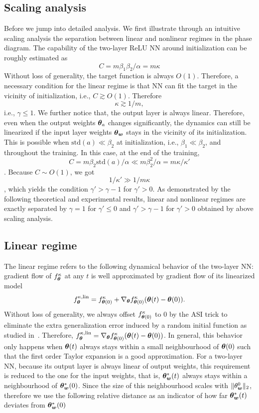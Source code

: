 \documentclass{article}
\begin{document}
\subsection{Scaling analysis}
Before we jump into detailed analysis. We first illustrate through an intuitive scaling analysis the separation between linear and nonlinear regimes in the phase diagram. 
The capability of the two-layer ReLU NN around initialization can be roughly estimated as 
\[
C = m \beta_1 \beta_2/\alpha=m\kappa
\]
Without loss of generality, the target function is always $O(1)$. Therefore, a necessary condition for the linear regime is that NN can fit the target in the vicinity of initialization, i.e., $C \gtrsim O(1)$. Therefore
\[
\kappa \gtrsim 1/m,
\]
i.e., $\gamma\leq1$. We further notice that, the output layer is always linear. Therefore, even when the output weights $\bm{\theta}_{a}$ changes significantly, the dynamics can still be linearized if the input layer weights $\bm{\theta}_{\bm{w}}$ stays in the vicinity of its initialization. This is possible when $\mathrm{std}(a)\ll \beta_2$ at initialization, i.e., $\beta_1\ll\beta_2$, and throughout the training. In this case, at the end of the training,  $$C = m\beta_2 \mathrm{std}(a)/\alpha  \ll m\beta_2^2/\alpha=m\kappa/\kappa'$$. Because $C \sim O(1)$, we got $$1/\kappa'\gg 1/m\kappa$$, which yields the condition $\gamma'>\gamma-1$ for $\gamma'>0$. As demonstrated by the following theoretical and experimental results, linear and nonlinear regimes are exactly separated by $\gamma=1$ for $\gamma'\leq0$ and $\gamma'>\gamma-1$ for $\gamma'>0$ obtained by above scaling analysis.

\subsection{Linear regime}
The linear regime refers to the following dynamical behavior of the two-layer NN: gradient flow of $f^{\kappa}_{\bm{\theta}}$ at any $t$ is well approximated by gradient flow of its linearized model 
\begin{equation}
    f^{\kappa,\mathrm{lin}}_{\bm{\theta}}=f^{\kappa}_{\bm{\theta}(0)}+\nabla_{\bm{\theta}}f^{\kappa}_{\bm{\theta}(0)}(\bm{\theta}(t)-\bm{\theta}(0)).    
\end{equation}
 Without loss of generality, we always offset $f^{\kappa}_{\bm{\theta}(0)}$ to $0$ by the ASI trick to eliminate the extra generalization error induced by a random initial function as studied in~\cite{zhang_type_2019}. Therefore, $f^{\kappa,\mathrm{lin}}_{\bm{\theta}}=\nabla_{\bm{\theta}}f^{\kappa}_{\bm{\theta}(0)}(\bm{\theta}(t)-\bm{\theta}(0))$. 
In general, this behavior only happens when $\bm{\theta}(t)$ always stays within a small neighbourhood of $\bm{\theta}(0)$ such that the first order Taylor expansion is a good approximation. For a two-layer NN, because its output layer is always linear of output weights, this requirement is reduced to the one for the input weights, that is, $\bm{\theta}^*_{\bm{w}}(t)$ always stays within a neighbourhood of $\bm{\theta}^*_{\bm{w}}(0)$. Since the size of this neighbourhood scales with $\lVert\theta_{\bm{w}}^{0}\rVert_{2}$, therefore we use the following relative distance as an indicator of how far $\bm{\theta}^*_{\bm{w}}(t)$ deviates from $\bm{\theta}^*_{\bm{w}}(0)$
\end{document}
